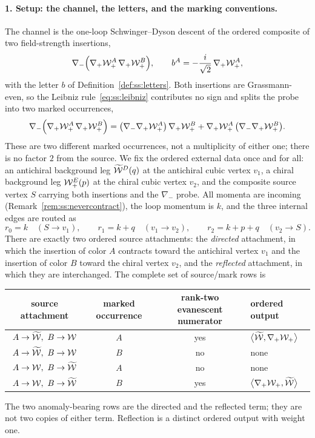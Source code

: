 \paragraph{1. Setup: the channel, the letters, and the marking conventions.}
The channel is the one-loop Schwinger--Dyson descent of the ordered composite
of two field-strength insertions,
\begin{equation}\label{eq:ss:seedchannel}
\nabla_{-}\Big(\nabla_{+}\mathcal{W}_{+}^{A}\,\nabla_{+}\mathcal{W}_{+}^{B}\Big),
\qquad
b^{A}=-\frac{i}{\sqrt2}\,\nabla_{+}\mathcal{W}_{+}^{A},
\end{equation}
with the letter $b$ of Definition~\ref{def:ss:letters}. Both insertions are
Grassmann-even, so the Leibniz rule~\eqref{eq:ss:leibniz} contributes no sign
and splits the probe into two marked occurrences,
\begin{equation}\label{eq:ss:seedleibniz}
\nabla_{-}\Big(\nabla_{+}\mathcal{W}_{+}^{A}\,\nabla_{+}\mathcal{W}_{+}^{B}\Big)
=\big(\nabla_{-}\nabla_{+}\mathcal{W}_{+}^{A}\big)\,\nabla_{+}\mathcal{W}_{+}^{B}
+\nabla_{+}\mathcal{W}_{+}^{A}\,\big(\nabla_{-}\nabla_{+}\mathcal{W}_{+}^{B}\big) .
\end{equation}
These are two different marked occurrences, not a multiplicity of either one;
there is no factor $2$ from the source. We fix the ordered external data once
and for all: an antichiral background leg $\widetilde{\mathcal{W}}^{D}(q)$ at the antichiral
cubic vertex $v_1$, a chiral background leg $\mathcal{W}_{+}^{E}(p)$ at the chiral
cubic vertex $v_2$, and the composite source vertex $S$ carrying both
insertions and the $\nabla_{-}$ probe. All momenta are incoming
(Remark~\ref{rem:ss:nevercontract}), the loop momentum is $k$, and the three
internal edges are routed as
\begin{equation}\label{eq:ss:seedrouting}
r_0=k\quad(S\to v_1),\qquad
r_1=k+q\quad(v_1\to v_2),\qquad
r_2=k+p+q\quad(v_2\to S).
\end{equation}
There are exactly two ordered source attachments: the \emph{directed}
attachment, in which the insertion of color $A$ contracts toward the
antichiral vertex $v_1$ and the insertion of color $B$ toward the chiral
vertex $v_2$, and the \emph{reflected} attachment, in which they are
interchanged. The complete set of source/mark rows is
\begin{center}
\begin{tabular}{cccl}
\hline
source attachment & marked occurrence & rank-two evanescent numerator &
ordered output\\
\hline
$A\to\bcW,\ B\to\cW$ & $A$ & yes &
$\big\langle\widetilde{\mathcal{W}},\nabla_{+}\mathcal{W}_{+}\big\rangle$\\
$A\to\bcW,\ B\to\cW$ & $B$ & no & none\\
$A\to\cW,\ B\to\bcW$ & $A$ & no & none\\
$A\to\cW,\ B\to\bcW$ & $B$ & yes &
$\big\langle\nabla_{+}\mathcal{W}_{+},\widetilde{\mathcal{W}}\big\rangle$\\
\hline
\end{tabular}
\end{center}
The two anomaly-bearing rows are the directed and the reflected term; they
are not two copies of either term. Reflection is a distinct ordered output
with weight one.

